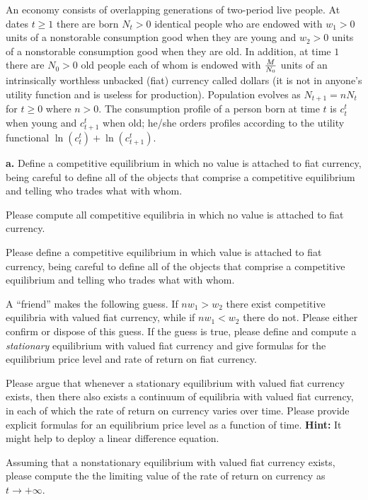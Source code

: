 \medskip
{}
\medskip
\noindent An economy consists of overlapping generations of two-period live people. At dates $t \geq 1$ there are born
$N_t >0$ identical people who are endowed with $w_1 >0$ units of a nonstorable consumption good when they
are young and $w_2 >0 $ units of a nonstorable consumption good when they are old.  In addition, at time $1$ there
are $N_0> 0$ old people each of whom is endowed with ${M \over N_0}$ units of an intrinsically worthless unbacked (fiat) currency called
dollars (it is not in anyone's utility function and is useless for production).  
Population evolves as $N_{t+1} = n N_t$ for $t \geq 0$ where $n >0$.  The consumption profile
of a person born at time $t$ is $c_t^t$ when young and $c_{t+1}^t$ when old; he/she orders profiles according to the
utility functional
$ \ln (c_t^t) + \ln (c^t_{t+1}) .$

\medskip
\noindent 
{\bf a.} Define a competitive equilibrium in which no value is attached to fiat currency, being careful to define all
of the objects that comprise a competitive equilibrium and telling who trades what with whom.

\medskip
{} Please compute all competitive equilibria in which no value is attached to fiat currency.

\medskip
{} Please define a competitive equilibrium in which value is attached to fiat currency, 
being careful to define all
of the objects that comprise a competitive equilibrium and telling who trades what with whom.

\medskip
{} A ``friend'' makes the following guess.  If $n w_1 > w_2$ there exist competitive equilibria
with valued fiat currency, while if $n w_1 < w_2$ there do not.  Please either confirm or dispose of this guess.
If the guess is true, please define and compute a {\it stationary\/} equilibrium with valued fiat currency and give formulas
for the equilibrium price level and rate of return on fiat currency.

\medskip
{} Please argue that whenever a stationary equilibrium with valued fiat currency exists, then there
also exists a continuum of equilibria with valued fiat currency, in each of which the rate of return on currency
varies over time.  Please provide explicit formulas for an equilibrium  price level as a function of time.  
{\bf Hint:} It might help to deploy a linear difference equation.

\medskip
{} Assuming that a nonstationary equilibrium with valued fiat currency exists, please compute the
the limiting value of the rate of return on currency as $t \rightarrow + \infty$. 




